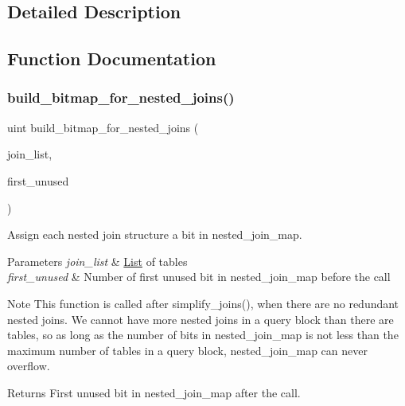 \subsection{Detailed Description}


\subsection{Function Documentation}
\mbox{\label{group__Query__Resolver_gab18726347ecf92d8985617dda1d60ba3}} 
\subsubsection{\texorpdfstring{build\+\_\+bitmap\+\_\+for\+\_\+nested\+\_\+joins()}{build\_bitmap\_for\_nested\_joins()}}
{\footnotesize\ttfamily uint build\+\_\+bitmap\+\_\+for\+\_\+nested\+\_\+joins (\begin{DoxyParamCaption}\item[{\mbox{\hyperlink{classList}{List}}$<$ \mbox{\hyperlink{structTABLE__LIST}{T\+A\+B\+L\+E\+\_\+\+L\+I\+ST}} $>$ $\ast$}]{join\+\_\+list,  }\item[{uint}]{first\+\_\+unused }\end{DoxyParamCaption})}

Assign each nested join structure a bit in nested\+\_\+join\+\_\+map.


\begin{DoxyParams}{Parameters}
{\em join\+\_\+list} & \mbox{\hyperlink{classList}{List}} of tables \\
\hline
{\em first\+\_\+unused} & Number of first unused bit in nested\+\_\+join\+\_\+map before the call\\
\hline
\end{DoxyParams}
\begin{DoxyNote}{Note}
This function is called after simplify\+\_\+joins(), when there are no redundant nested joins. We cannot have more nested joins in a query block than there are tables, so as long as the number of bits in nested\+\_\+join\+\_\+map is not less than the maximum number of tables in a query block, nested\+\_\+join\+\_\+map can never overflow.
\end{DoxyNote}
\begin{DoxyReturn}{Returns}
First unused bit in nested\+\_\+join\+\_\+map after the call. 
\end{DoxyReturn}
\mbox{\label{group__Query__Resolver_ga180a0a53f32a387f8af2c3b9db83d09e}} 
